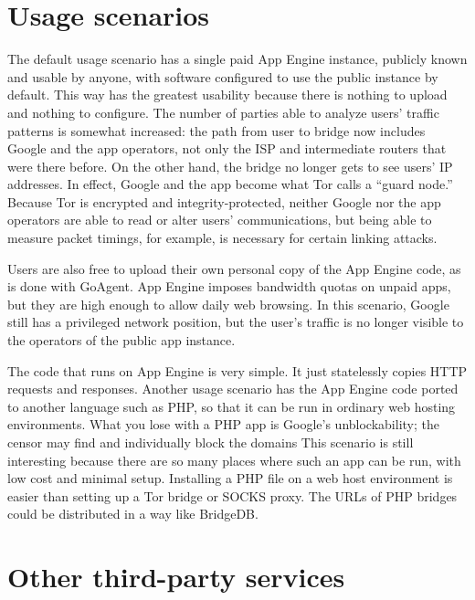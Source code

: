 \documentclass{article}
\begin{document}

\section{Usage scenarios}

The default usage scenario has a single paid App Engine instance, publicly known and usable by anyone,
with software configured to use the public instance by default.
This way has the greatest usability because there is nothing to upload and nothing to configure.
The number of parties able to analyze users' traffic patterns is somewhat increased:
the path from user to bridge now includes Google and the app operators, not only the ISP and intermediate routers that were there before.
On the other hand, the bridge no longer gets to see users' IP addresses.
In effect, Google and the app become what Tor calls a ``guard node.''
Because Tor is encrypted and integrity-protected, neither Google nor the app operators
are able to read or alter users' communications, but being able to measure packet timings,
for example, is necessary for certain linking attacks.

Users are also free to upload their own personal copy of the App Engine code, as is done with GoAgent.
App Engine imposes bandwidth quotas on unpaid apps, but they are high enough to allow daily web browsing.
In this scenario, Google still has a privileged network position,
but the user's traffic is no longer visible to the operators of the public app instance.

The code that runs on App Engine is very simple.
It just statelessly copies HTTP requests and responses.
Another usage scenario has the App Engine code ported to another language such as PHP,
so that it can be run in ordinary web hosting environments.
What you lose with a PHP app is Google's unblockability;
the censor may find and individually block the domains
This scenario is still interesting because there are so many places
where such an app can be run, with low cost and minimal setup.
Installing a PHP file on a web host environment is easier than setting up a Tor bridge or SOCKS proxy.
The URLs of PHP bridges could be distributed in a way like BridgeDB.

\section{Other third-party services}
\end{document}
